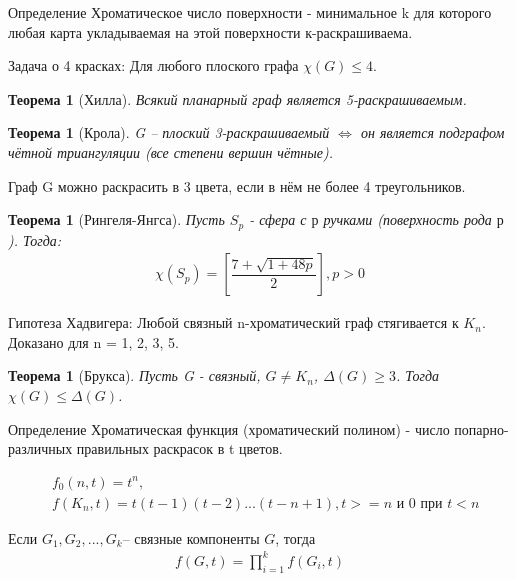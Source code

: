 \documentclass[a4paper,openany]{book}
\newcounter{TheoremCounter}
\newtheorem{theorem}[TheoremCounter]{Теорема}
\newenvironment{definition}
{\begin{statement}{Определение}}
    {\end{statement}}
\newenvironment{consequence}{}{}
\begin{document}
\begin{definition}
  Хроматическое число поверхности - минимальное k для которого любая карта укладываемая на этой поверхности  к-раскрашиваема.
\end{definition}

Задача о 4 красках: Для любого плоского графа $\chi(G) \leqslant 4$.

\begin{theorem}[Хилла]
  Всякий планарный граф является  5-раскрашиваемым.
\end{theorem}

\begin{theorem}[Крола]
  G – плоский 3-раскрашиваемый $\Leftrightarrow$ он является подграфом чётной триангуляции (все степени вершин чётные).
\end{theorem}

\begin{consequence}
  Граф G можно раскрасить в 3 цвета, если в нём не более 4 треугольников.
\end{consequence}

\begin{theorem}[Рингеля-Янгса]
  Пусть $S_p$ - сфера с $р$ ручками (поверхность рода $р$). Тогда:
  \begin{align*}
    \chi(S_p) = \left[\dfrac{7 + \sqrt{1+48p}}{2}\right], p > 0
  \end{align*}
\end{theorem}

Гипотеза Хадвигера: Любой связный n-хроматический граф стягивается к $K_n$.
Доказано для n = 1, 2, 3, 5.

\begin{theorem}[Брукса]
  Пусть G - связный, $G \neq K_n$, $\Delta(G) \geqslant 3$. Тогда  $\chi(G) \leqslant \Delta(G)$.
\end{theorem}

\begin{definition}
  Хроматическая функция (хроматический полином) - число попарно-различных
  правильных раскрасок в t цветов.
\end{definition}

\begin{align*}
  &f_0(n, t) = t^n,\\
  &f(K_n, t) = { t(t-1)(t-2)...(t-n+1), t >= n \text{ и } 0 \text{ при } t < n }
\end{align*}

\begin{stm}
  Если $G_1, G_2, ..., G_k$– связные компоненты $G$, тогда
  \begin{align*}
    f(G, t) = \prod_{i = 1}^kf(G_i, t)
  \end{align*}
\end{stm}
\end{document}
